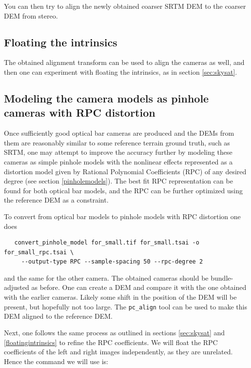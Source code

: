 You can then try to align the newly obtained coarser SRTM DEM to the 
coarser DEM from stereo. 

\subsection{Floating the intrinsics}

The obtained alignment transform can be used to align 
the cameras as well, and then one can experiment with 
floating the intrinsics, as in section \ref{sec:skysat}.

\subsection{Modeling the camera models as pinhole cameras with RPC distortion}

Once sufficiently good optical bar cameras are produced and the DEMs
from them are reasonably similar to some reference terrain ground truth,
such as SRTM, one may attempt to improve the accuracy further by
modeling these cameras as simple pinhole models with the nonlinear
effects represented as a distortion model given by Rational Polynomial
Coefficients (RPC) of any desired degree (see section
\ref{pinholemodels}). The best fit RPC representation can be found for
both optical bar models, and the RPC can be further optimized using the
reference DEM as a constraint.

To convert from optical bar models to pinhole models with RPC distortion
one does

\begin{verbatim}
   convert_pinhole_model for_small.tif for_small.tsai -o for_small_rpc.tsai \
     --output-type RPC --sample-spacing 50 --rpc-degree 2
\end{verbatim}

and the same for the other camera. The obtained cameras should be
bundle-adjusted as before. One can create a DEM and compare
it with the one obtained with the earlier cameras. Likely 
some shift in the position of the DEM will be present, but hopefully 
not too large. The \texttt{pc\_align} tool can be used 
to make this DEM aligned to the reference DEM. 

Next, one follows the same process as outlined in sections
\ref{sec:skysat} and \ref{floatingintrinsics} to refine the RPC
coefficients. We will float the RPC coefficients of the left and
right images independently, as they are unrelated. Hence the command
we will use is:

